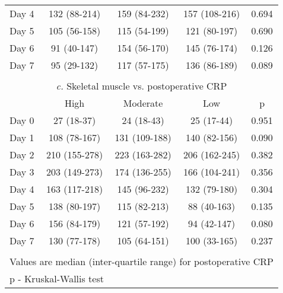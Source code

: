 \begin{table}[p]
\begin{tabular}{|l c c c c |}
		Day 4 & 132 (88-214)  & 159 (84-232)  & 157 (108-216) & 0.694                      \\
		Day 5 & 105 (56-158)  & 115 (54-199)  & 121 (80-197)  & 0.690                      \\
		Day 6 & 91 (40-147)   & 154 (56-170)  & 145 (76-174)  & 0.126                      \\
		Day 7 & 95 (29-132)   & 117 (57-175)  & 136 (86-189)  & 0.089                      \\ \hline
		                               \multicolumn{5}{c}{}                                \\
		      \multicolumn{5}{c}{\textit{c.} Skeletal muscle vs. postoperative CRP}        \\ \hline
		      & High          & Moderate      & Low           & p                          \\
		Day 0 & 27 (18-37)    & 24 (18-43)    & 25 (17-44)    & 0.951                      \\
		Day 1 & 108 (78-167)  & 131 (109-188) & 140 (82-156)  & 0.090                      \\
		Day 2 & 210 (155-278) & 223 (163-282) & 206 (162-245) & 0.382                      \\
		Day 3 & 203 (149-273) & 174 (136-255) & 166 (104-241) & 0.356                      \\
		Day 4 & 163 (117-218) & 145 (96-232)  & 132 (79-180)  & 0.304                      \\
		Day 5 & 138 (80-197)  & 115 (82-213)  & 88 (40-163)   & 0.135                      \\
		Day 6 & 156 (84-179)  & 121 (57-192)  & 94 (42-147)   & 0.080                      \\
		Day 7 & 130 (77-178)  & 105 (64-151)  & 100 (33-165)  & 0.237                      \\ \hline
		                               \multicolumn{5}{c}{}                                \\
		\multicolumn{5}{l}{Values are median (inter-quartile range) for postoperative CRP} \\
		\multicolumn{5}{l}{p - Kruskal-Wallis test}
	\end{tabular}	
\end{table}



